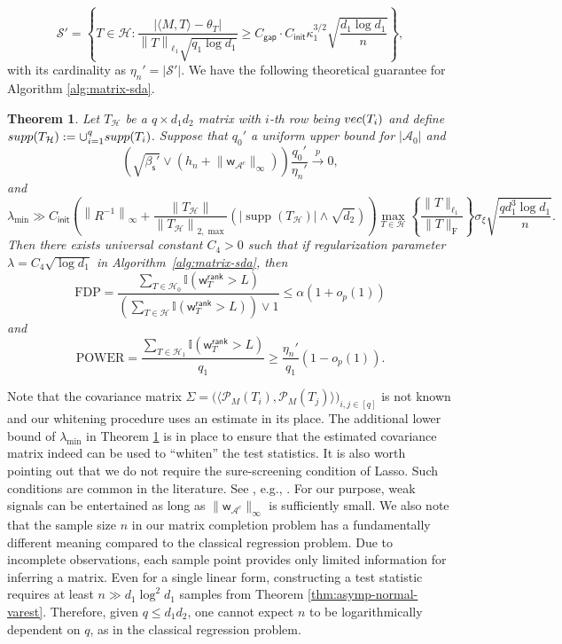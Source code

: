 \documentclass[12pt]{article}
\newcommand{\abs}[1]{\left\lvert#1\right\rvert}
\newcommand{\norm}[1]{\left\lVert#1\right\rVert}
\newcommand{\cH}{\mathcal{H}}
\newcommand{\cS}{\mathcal{S}}
\newcommand{\bbI}{\mathbb{I}}
\def\sfw{\mathsf{w}}
\def\calA{{\mathcal A}}
\def\calH{{\mathcal H}}
\def\calP{{\mathcal P}}
\newcommand{\init}{{\mathsf{init}}}
\newtheorem{Theorem}{Theorem}
\theoremstyle{plain}
\begin{document}
\begin{sloppypar}
\begin{equation}\label{eq:strong-text}
\cS' = \left\{ T\in \cH: \frac{ \abs{\langle M, T\rangle-\theta_T } }{   \norm{T}_{\ell_1} \sqrt{ q_1 \log d_1 } } \ge C_{\mathsf{gap} } \cdot C_{\init} \kappa_1^{3/2} \sqrt{\frac{d_1 \log d_1}{n}} \right\},
\end{equation}
with its cardinality as $\eta_n'=\abs{\cS'}$. We have the following theoretical guarantee for Algorithm \ref{alg:matrix-sda}.
\begin{Theorem}\label{thm:matrix-fdr-strong}
 Let $T_{\calH}$ be a $q\times d_1d_2$ matrix with $i$-th row being ${\rm vec}(T_i)$ and define ${\rm supp}(T_{\calH}):=\cup_{i=1}^q {\rm supp}(T_i)$. Suppose that $q_{0}'$ a uniform upper bound for $\abs{\calA_0}$ and  
$$
\left(\sqrt{\beta_{\mathsf{s}}'} \vee  \left( h_n +\big\|\sfw_{\calA^c}\big\|_{\infty}\right)\right)  \frac{q_0'}{\eta_n'}   \overset{p}{\rightarrow} 0, 
$$
and 
\begin{equation}\label{eq:SNR-strong-dep}
    \lambda_{\min}\gg 
    C_{\init}\left(\norm{ R^{-1}  }_\infty + \frac{  \norm{T_{\calH} }}{ \norm{T_{\calH} }_{2,\max} } \left( |\operatorname{supp}(T_{\calH} )|\wedge \sqrt{d_2} \right) \right) \max_{T\in\calH}\left\{ \frac{ \|T\|_{\ell_1} }{ \|T\|_{\mathrm{F}} } \right\} \sigma_\xi \sqrt{\frac{ q d_1^3 \log d_1 }{n}}.
\end{equation}
Then there exists universal constant $C_4>0$ such that if regularization parameter $\lambda=C_4\sqrt{\log d_1 }$ in Algorithm~\ref{alg:matrix-sda}, then
$$
\mathrm{FDP}=\frac{\sum_{T\in \cH_0  } \bbI(\sfw_{T}^{\mathsf{rank}} >L ) }{\left( \sum_{T\in \cH  } \bbI(\sfw_T^{\mathsf{rank}} >L ) \right) \vee 1 } \le \alpha(1+o_p(1))
$$
and
$$
\mathrm{POWER}= \frac{\sum_{T\in \cH_1  } \bbI(\sfw_T^{\mathsf{rank}} >L ) }{q_1} \ge \frac{\eta_n' }{q_1}(1-o_p(1)).
$$   
\end{Theorem}

Note that the covariance matrix $\Sigma=\big(\langle \calP_{M}(T_i), \calP_M(T_j)\rangle\big)_{i,j\in[q]}$ is not known and our whitening procedure uses an estimate in its place. The additional lower bound of $\lambda_{\min}$ in Theorem \ref{thm:matrix-fdr-strong} is in place to ensure that the estimated covariance matrix indeed can be used to ``whiten'' the test statistics. It is also worth pointing out that we do not require the sure-screening condition of Lasso. Such conditions are common in the literature. See , e.g., \cite{roeder2009genome,barber2019knockoff,du2021false,dai2023scale}. For our purpose, weak signals can be entertained as long as $\|\sfw_{\calA^c}\|_{\infty}$ is sufficiently small. We also note that the sample size $n$ in our matrix completion problem has a fundamentally different meaning compared to the classical regression problem. Due to incomplete observations, each sample point provides only limited information for inferring a matrix. Even for a single linear form, constructing a test statistic requires at least $n\gg d_1\log^2 d_1$ samples from Theorem \ref{thm:asymp-normal-varest}. Therefore, given $q\le d_1 d_2$, one cannot expect $n$ to be logarithmically dependent on $q$, as in the classical regression problem.



\end{sloppypar}
\end{document}
